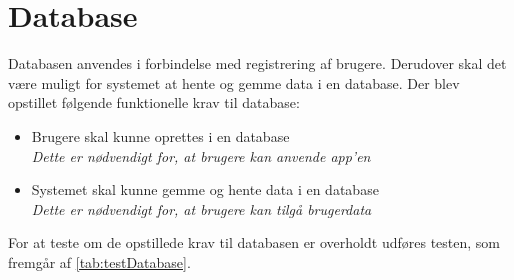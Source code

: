 \section{Database}
Databasen anvendes i forbindelse med registrering af brugere. Derudover skal det være muligt for systemet at hente og gemme data i en database. Der blev opstillet følgende funktionelle krav til database:
 
\begin{itemize}
\item Brugere skal kunne oprettes i en database
\\
\textit{Dette er nødvendigt for, at brugere kan anvende app’en}
\item Systemet skal kunne gemme og hente data i en database
\\
\textit{Dette er nødvendigt for, at brugere kan tilgå brugerdata}
\end{itemize}

\noindent
For at teste om de opstillede krav til databasen er overholdt udføres testen, som fremgår af \autoref{tab:testDatabase}.

